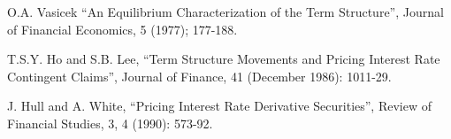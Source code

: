     
O.A. Vasicek ``An Equilibrium Characterization of the Term Structure'',
Journal of Financial Economics, 5 (1977); 177-188.

T.S.Y. Ho and S.B. Lee, ``Term Structure Movements and Pricing Interest
Rate Contingent Claims'', Journal of Finance, 41 (December 1986):
1011-29.

J. Hull and A. White, ``Pricing Interest Rate Derivative Securities'',
Review of Financial Studies, 3, 4 (1990): 573-92.


